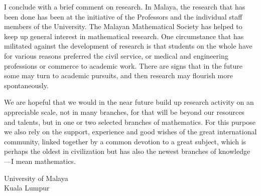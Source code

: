 I conclude with a brief comment on research. In Malaya, the research
that has been done has been at the initiative of the Professors and
the individual staff members of the University. The Malayan
Mathematical Society has helped to keep up general interest in
mathematical research. One circumstance that has militated against the
development of research is that students on the whole have for various
reasons preferred the civil service, or medical and engineering 
professions or commerce to academic work. There are signs that in the
future some may turn to academic pursuits, and then research may
flourish more spontaneously.

We are hopeful that we would in the near future build up research
activity on an appreciable scale, not in many branches, for that will
be beyond our resources and talents, but in one or two selected
branches of mathematics. For this purpose we also rely on the support,
experience and good wishes of the great international community,
linked together by a common devotion to a great subject, which is
perhaps the oldest in civilization but has also the newest branches of
knowledge---I mean mathematics.

\bigskip
\bigskip

\noindent
{\fontsize{9pt}{11pt}\selectfont
University of Malaya\\
Kuala Lumpur
}\relax

